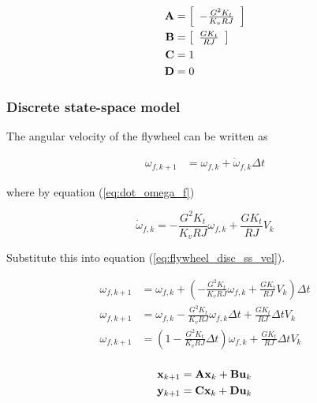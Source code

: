 \begin{align}
  \mathbf{A} &= \left[
  \begin{array}{c}
    -\frac{G^2 K_t}{K_v RJ}
  \end{array}
  \right] \\
  \mathbf{B} &= \left[
  \begin{array}{c}
    \frac{G K_t}{RJ}
  \end{array}
  \right] \\
  \mathbf{C} &= 1 \\
  \mathbf{D} &= 0
\end{align}

\subsubsection{Discrete state-space model}

The angular velocity of the flywheel can be written as

\begin{align}
  \omega_{f,k+1} &= \omega_{f,k} + \dot{\omega}_{f,k} \Delta t
    \label{eq:flywheel_disc_ss_vel}
\end{align}

where by equation (\ref{eq:dot_omega_f})

\begin{equation*}
  \dot{\omega}_{f,k} = -\frac{G^2 K_t}{K_v RJ} \omega_{f,k} +
    \frac{G K_t}{RJ} V_k
\end{equation*}

Substitute this into equation (\ref{eq:flywheel_disc_ss_vel}).

\begin{align}
  \omega_{f,k+1} &= \omega_{f,k} + \left(-\frac{G^2 K_t}{K_v RJ} \omega_{f,k} +
    \frac{G K_t}{RJ} V_k\right) \Delta t \nonumber \\
  \omega_{f,k+1} &= \omega_{f,k} - \frac{G^2 K_t}{K_v RJ} \omega_{f,k}
    \Delta t + \frac{G K_t}{RJ} \Delta t V_k \nonumber \\
  \omega_{f,k+1} &= \left(1 - \frac{G^2 K_t}{K_v RJ} \Delta t\right)
    \omega_{f,k} + \frac{G K_t}{RJ} \Delta t V_k \nonumber \\
\end{align}

\begin{align*}
  \mathbf{x}_{k+1} &= \mathbf{A} \mathbf{x}_k + \mathbf{B} \mathbf{u}_k \\
  \mathbf{y}_{k+1} &= \mathbf{C} \mathbf{x}_k + \mathbf{D} \mathbf{u}_k
\end{align*}

